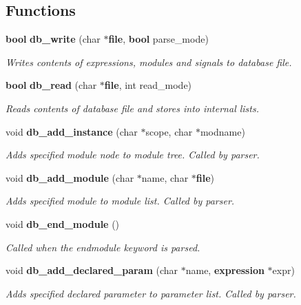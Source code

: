 \subsection*{Functions}
\begin{CompactItemize}
\item 
{\bf bool} {\bf db\_\-write} (char $\ast${\bf file}, {\bf bool} parse\_\-mode)
\begin{CompactList}\small\item\em Writes contents of expressions, modules and signals to database file. \item\end{CompactList}\item 
{\bf bool} {\bf db\_\-read} (char $\ast${\bf file}, int read\_\-mode)
\begin{CompactList}\small\item\em Reads contents of database file and stores into internal lists. \item\end{CompactList}\item 
void {\bf db\_\-add\_\-instance} (char $\ast$scope, char $\ast$modname)
\begin{CompactList}\small\item\em Adds specified module node to module tree. Called by parser. \item\end{CompactList}\item 
void {\bf db\_\-add\_\-module} (char $\ast$name, char $\ast${\bf file})
\begin{CompactList}\small\item\em Adds specified module to module list. Called by parser. \item\end{CompactList}\item 
void {\bf db\_\-end\_\-module} ()
\begin{CompactList}\small\item\em Called when the endmodule keyword is parsed. \item\end{CompactList}\item 
void {\bf db\_\-add\_\-declared\_\-param} (char $\ast$name, {\bf expression} $\ast$expr)
\begin{CompactList}\small\item\em Adds specified declared parameter to parameter list. Called by parser. \item\end{CompactList}\item 

\end{CompactItemize}
